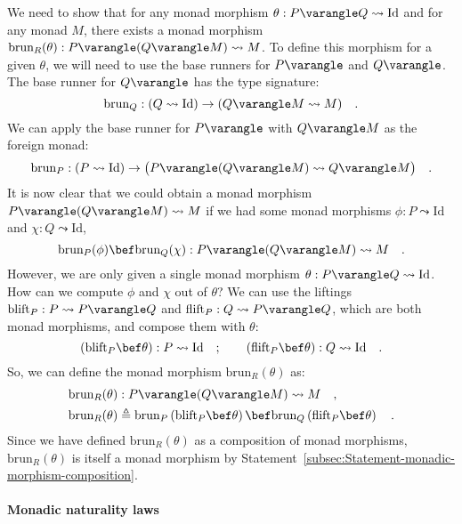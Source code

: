 We need to show that for any monad morphism $\theta:P\varangle Q\leadsto\text{Id}$
and for any monad $M$, there exists a monad morphism $\text{brun}_{R}(\theta):P\varangle(Q\varangle M)\leadsto M$.
To define this morphism for a given $\theta$, we will need to use
the base runners for $P\varangle$ and $Q\varangle$. The base runner
for $Q\varangle$ has the type signature:
\[
\text{brun}_{Q}:\left(Q\leadsto\text{Id}\right)\rightarrow(Q\varangle M\leadsto M)\quad.
\]
We can apply the base runner for $P\varangle$ with $Q\varangle M$
as the foreign monad:
\[
\text{brun}_{P}:\left(P\leadsto\text{Id}\right)\rightarrow\big(P\varangle(Q\varangle M)\leadsto Q\varangle M\big)\quad.
\]
It is now clear that we could obtain a monad morphism $P\varangle(Q\varangle M)\leadsto M$
if we had some monad morphisms $\phi:P\leadsto\text{Id}$ and $\chi:Q\leadsto\text{Id}$,
\[
\text{brun}_{P}(\phi)\bef\text{brun}_{Q}(\chi):P\varangle(Q\varangle M)\leadsto M\quad.
\]
However, we are only given a single monad morphism $\theta:P\varangle Q\leadsto\text{Id}$.
How can we compute $\phi$ and $\chi$ out of $\theta$? We can use
the liftings $\text{blift}_{P}:P\leadsto P\varangle Q$ and $\text{flift}_{P}:Q\leadsto P\varangle Q$,
which are both monad morphisms, and compose them with $\theta$:
\[
\left(\text{blift}_{P}\bef\theta\right):P\leadsto\text{Id}\quad;\quad\quad\left(\text{flift}_{P}\bef\theta\right):Q\leadsto\text{Id}\quad.
\]
So, we can define the monad morphism $\text{brun}_{R}(\theta)$ as:
\begin{align*}
\text{brun}_{R}(\theta) & :P\varangle(Q\varangle M)\leadsto M\quad,\\
\text{brun}_{R}(\theta) & \triangleq\text{brun}_{P}\left(\text{blift}_{P}\bef\theta\right)\bef\text{brun}_{Q}\left(\text{flift}_{P}\bef\theta\right)\quad.
\end{align*}
Since we have defined $\text{brun}_{R}(\theta)$ as a composition
of monad morphisms, $\text{brun}_{R}(\theta)$ is itself a monad morphism
by Statement~\ref{subsec:Statement-monadic-morphism-composition}.


\paragraph{Monadic naturality laws}


